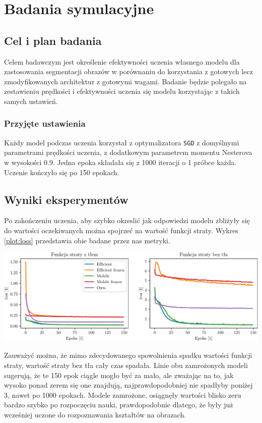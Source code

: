\documentclass[10pt]{article}
\begin{document}
\section{Badania symulacyjne}

\subsection{Cel i plan badania}

Celem badawczym jest określenie efektywności uczenia własnego modelu dla zastosowania segmentacji obrazów w porównaniu do korzystania z gotowych lecz zmodyfikowanych architektur z gotowymi wagami. Badanie będzie polegało na zestawieniu prędkości i efektywności uczenia się modelu korzystając z takich samych ustawień.

\subsubsection{Przyjęte ustawienia}
Każdy model podczas uczenia korzystał z optymalizatora \verb+SGD+ z domyślnymi parametrami prędkości uczenia, z dodatkowym parametrem momentu Nesterova w wysokości 0.9. Jedna epoka składała się z 1000 iteracji o 1 próbce każda. Uczenie kończyło się po 150 epokach.

\subsection{Wyniki eksperymentów} 
Po zakończeniu uczenia, aby szybko okreslić jak odpowiedzi modelu zbliżyły się do wartości oczekiwanych można spojrzeć na wartość funkcji straty. Wykres \ref{plot:loss} przedstawia obie badane przez nas metryki.

\begin{center}
  \includegraphics[width=0.9\linewidth]{figures/loss.pdf}
  \label{plot:loss}
\end{center}

Zauważyć można, że mimo zdecydowanego spowolnienia spadku wartości funkcji straty, wartość straty bez tła cały czas spadała. Linie obu zamrożonych modeli sugerują, że te 150 epok ciągle mogło być za mało, ale zważając na to, jak wysoko ponad zerem się one znajdują, najprawdopodobniej nie spadłyby poniżej 3, nawet po 1000 epokach. Modele zamrożone, osiągnęły wartości blisko zeru bardzo szybko po rozpoczęciu nauki, prawdopodobnie dlatego, że były już wcześniej uczone do rozpoznawania kształtów na obrazach.
\end{document}
